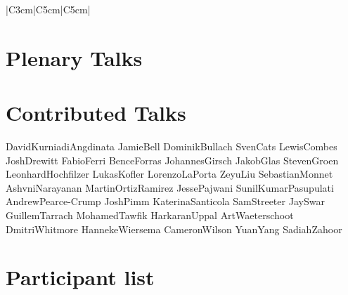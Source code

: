 \documentclass[booklet]{ConferenceMaterials}
\theoremstyle{definition}
\begin{document}
\newpage
\phantom{}

\begin{scheduleday}{2}{|C{3cm}|C{5cm}|C{5cm}|}
\end{scheduleday}
\newpage


\section*{Plenary Talks}
\vspace{20pt}
\vspace{20pt}

\newpage

\section*{Contributed Talks}
              {DavidKurniadiAngdinata}
              {JamieBell}
              {DominikBullach}
              {SvenCats}
\newpage
{}
              {LewisCombes}
              {JoshDrewitt}
              {FabioFerri}
              {BenceForras}
\newpage
{}
              {JohannesGirsch}
              {JakobGlas}
              {StevenGroen}
              {LeonhardHochfilzer}
              {LukasKofler}
\newpage
{}
              {LorenzoLaPorta}
              {ZeyuLiu}
              {SebastianMonnet}
              {AshvniNarayanan}
              {MartinOrtizRamirez}
\newpage
{}
              {JessePajwani}
              {SunilKumarPasupulati}
              {AndrewPearce-Crump}
              {JoshPimm}
\newpage
{}
              {KaterinaSanticola}
              {SamStreeter}
              {JaySwar}
              {GuillemTarrach}
              {MohamedTawfik}
\newpage
{}
              {HarkaranUppal}
              {ArtWaeterschoot}
              {DmitriWhitmore}
              {HannekeWiersema}
              {CameronWilson}
\newpage
{}
              {YuanYang}
              {SadiahZahoor}

\newpage

\section*{Participant list}
\begin{participantlist}{4.5cm}{6cm}{7.7cm}
    
\end{participantlist}
\end{document}
